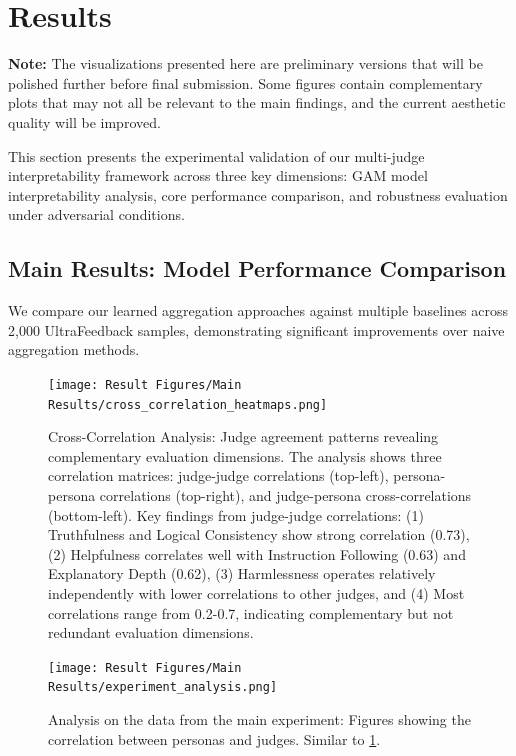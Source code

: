 \section{Results}

\textbf{Note:} The visualizations presented here are preliminary versions that will be polished further before final submission. Some figures contain complementary plots that may not all be relevant to the main findings, and the current aesthetic quality will be improved.

This section presents the experimental validation of our multi-judge interpretability framework across three key dimensions: GAM model interpretability analysis, core performance comparison, and robustness evaluation under adversarial conditions.

\subsection{Main Results: Model Performance Comparison}

We compare our learned aggregation approaches against multiple baselines across 2,000 UltraFeedback samples, demonstrating significant improvements over naive aggregation methods.

\begin{figure}[htbp]
    \centering
    \texttt{[image: Result Figures/Main Results/cross\_correlation\_heatmaps.png]}
    \caption{Cross-Correlation Analysis: Judge agreement patterns revealing complementary evaluation dimensions. The analysis shows three correlation matrices: judge-judge correlations (top-left), persona-persona correlations (top-right), and judge-persona cross-correlations (bottom-left). Key findings from judge-judge correlations: (1) Truthfulness and Logical Consistency show strong correlation (0.73), (2) Helpfulness correlates well with Instruction Following (0.63) and Explanatory Depth (0.62), (3) Harmlessness operates relatively independently with lower correlations to other judges, and (4) Most correlations range from 0.2-0.7, indicating complementary but not redundant evaluation dimensions.}
    \label{fig:cross_correlation}
\end{figure}

\begin{figure}[htbp]
    \centering
    \texttt{[image: Result Figures/Main Results/experiment\_analysis.png]}
    \caption{Analysis on the data from the main experiment: Figures showing the correlation between personas and judges. Similar to \ref{fig:cross_correlation}.}
    \label{fig:experiment_analysis}
\end{figure}

